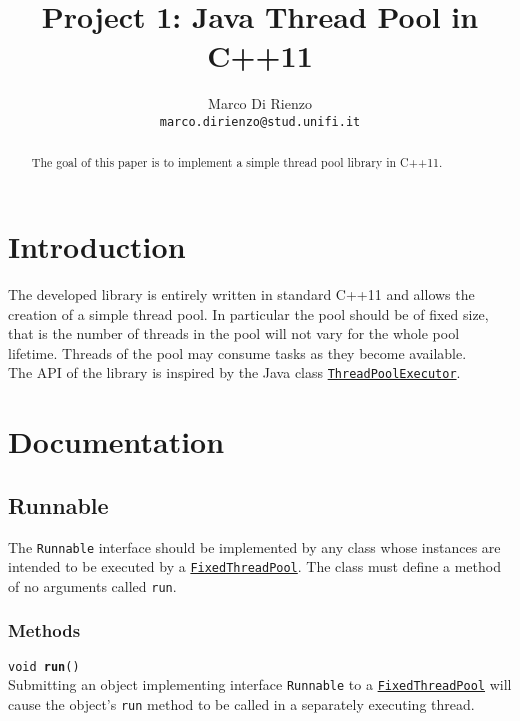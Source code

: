 \documentclass[10pt,twocolumn,letterpaper]{article}
\begin{document}
	
	\title{Project 1: Java Thread Pool in C++11}
	
	\author{Marco Di Rienzo\\
		{\tt\small marco.dirienzo@stud.unifi.it}
	}
	
	\maketitle
	\thispagestyle{empty}
	
	\begin{abstract}
		The goal of this paper is to implement a simple thread pool library in C++11.
	\end{abstract}
	
	\section{Introduction}
	The developed library is entirely written in standard C++11 and allows the creation of a simple thread pool. In particular the pool should be of fixed size, that is the number of threads in the pool will not vary for the whole pool lifetime. Threads of the pool may consume tasks as they become available.\\
	The API of the library is inspired by the Java class \href{https://docs.oracle.com/javase/7/docs/api/java/util/concurrent/ThreadPoolExecutor.html}{\lstinline|ThreadPoolExecutor|}.
	
	\section{Documentation} \label{docs}
	\subsection{Runnable}\label{sec:runnable}
	\noindent
	The \lstinline|Runnable| interface should be implemented by any class whose instances are intended to be executed by a \hyperref[sec:ftp]{\lstinline|FixedThreadPool|}. The class must define a method of no arguments called \lstinline|run|.
	\subsubsection{Methods}
	\texttt{void \textbf{run}()}\\
	Submitting an object implementing interface \lstinline|Runnable| to a \hyperref[ftp]{\lstinline|FixedThreadPool|} will cause the object's \lstinline|run| method to be called in a separately executing thread.
	
\end{document}
